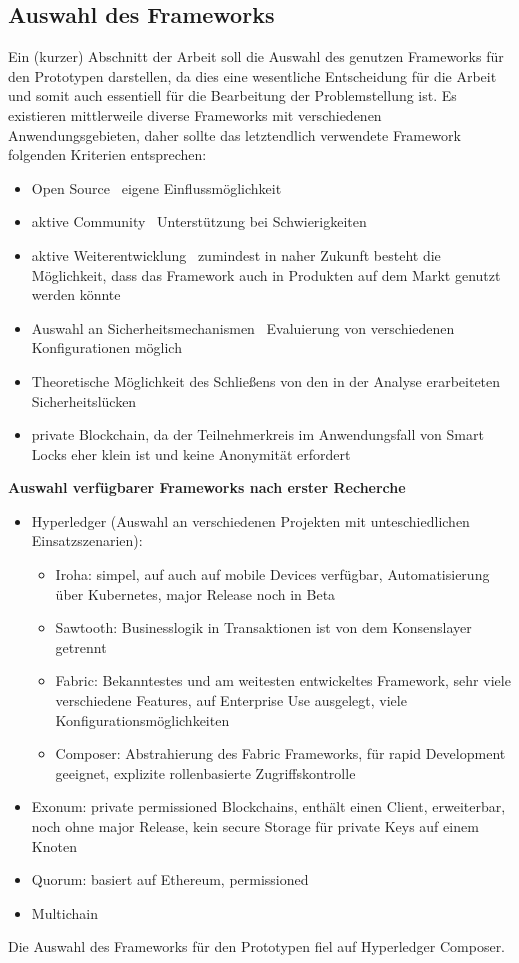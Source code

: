 \subsection{Auswahl des Frameworks}
\label{sec:prototype_framework}
    Ein (kurzer) Abschnitt der Arbeit soll die Auswahl des genutzen Frameworks für den Prototypen darstellen, da dies eine wesentliche Entscheidung für die Arbeit und somit auch essentiell für die Bearbeitung der Problemstellung ist.
    Es existieren mittlerweile diverse Frameworks mit verschiedenen Anwendungsgebieten, daher sollte das letztendlich verwendete Framework folgenden Kriterien entsprechen:
    \begin{itemize}[noitemsep]
        \item Open Source \textrightarrow\ eigene Einflussmöglichkeit
        \item aktive Community \textrightarrow\ Unterstützung bei Schwierigkeiten
        \item aktive Weiterentwicklung \textrightarrow\ zumindest in naher Zukunft besteht die Möglichkeit, dass das Framework auch in Produkten auf dem Markt genutzt werden könnte
        \item Auswahl an Sicherheitsmechanismen \textrightarrow\ Evaluierung von verschiedenen Konfigurationen möglich
        \item Theoretische Möglichkeit des Schließens von den in der Analyse erarbeiteten Sicherheitslücken
        \item private Blockchain, da der Teilnehmerkreis im Anwendungsfall von Smart Locks eher klein ist und keine Anonymität erfordert
    \end{itemize}
    \medskip
    \textbf{Auswahl verfügbarer Frameworks nach erster Recherche}
    \begin{itemize}[noitemsep]
        \item Hyperledger (Auswahl an verschiedenen Projekten mit unteschiedlichen Einsatzszenarien):
            \begin{itemize}[noitemsep]
                \item Iroha: simpel, auf auch auf mobile Devices verfügbar, Automatisierung über Kubernetes, major Release noch in Beta
                \item Sawtooth: Businesslogik in Transaktionen ist von dem Konsenslayer getrennt
                \item Fabric: Bekanntestes und am weitesten entwickeltes Framework, sehr viele verschiedene Features, auf Enterprise Use ausgelegt, viele Konfigurationsmöglichkeiten
                \item Composer: Abstrahierung des Fabric Frameworks, für rapid Development geeignet, explizite rollenbasierte Zugriffskontrolle
            \end{itemize}
        \item Exonum: private permissioned Blockchains, enthält einen Client, erweiterbar, noch ohne major Release, kein secure Storage für private Keys auf einem Knoten
        \item Quorum: basiert auf Ethereum, permissioned
        \item Multichain
    \end{itemize}
    Die Auswahl des Frameworks für den Prototypen fiel auf Hyperledger Composer.
